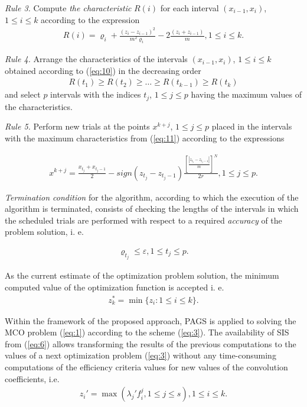 \documentclass[runningheads]{llncs}
\begin{document}
\textit{Rule 3.} Compute \textit{the characteristic} $R(i)$ for each interval $(x_{i-1},x_i)$, $1 \leq i \leq k$ according to the expression 
\begin{eqnarray} \label{eq:10}
R(i) = \varrho_i + \frac{(z_i - z_{i-1})^2}{m^2 \varrho_i} - 2 \frac{(z_i + z_{i-1})}{m}, 1 \leq i \leq k.
\end{eqnarray}

\textit{Rule 4.} Arrange the characteristics of the intervals $(x_{i-1},x_i)$, $1 \leq i \leq k$ obtained according to (\ref{eq:10}) in the decreasing order 
\begin{eqnarray} \label{eq:11}
R(t_1) \geq R(t_2)\geq \dots \geq R(t_{k-1}) \geq R(t_k) 
\end{eqnarray}
and select $p$ intervals with the indices $t_j$, $1 \leq j \leq p$ having the maximum values of the characteristics.

\textit{Rule 5.} Perform new trials at the points $x^{k+j}$, $1 \leq j \leq p$ placed in the intervals with the maximum characteristics from (\ref{eq:11}) according to the expressions 

\begin{eqnarray} \label{eq:12}
	x^{k+j} = \frac{x_{t_j} + x_{t_j-1}}{2}
	- sign(z_{t_j} - z_{t_j-1}) \frac{[\frac{|z_{t_j} - z_{t_j-1}|}{m}]^N}{2r} , 1\leq j \leq p.
\end{eqnarray}

\textit{Termination condition} for the algorithm, according to which the execution of the algorithm is terminated, consists of checking the lengths of the intervals in which the scheduled trials are performed with respect to a required \textit{accuracy} of the problem solution, i. e.

\begin{eqnarray} \label{eq:13}
\varrho_{t_j} \leq \varepsilon, 1 \leq t_j \leq p.
\end{eqnarray}

As the current estimate of the optimization problem solution, the minimum computed value of the optimization function is accepted i. e.
\begin{eqnarray} \label{eq:14}
z_k^*=\min{\{z_i:1\leq i \leq k\}}.
\end{eqnarray}

Within the framework of the proposed approach, PAGS is applied to solving the MCO problem (\ref{eq:1}) according to the scheme (\ref{eq:3}). The availability of SIS from (\ref{eq:6}) allows transforming the results of the previous computations to the values of a next optimization problem (\ref{eq:3}) without any time-consuming computations of the efficiency criteria values for new values of the convolution coefficients, i.e.
\begin{eqnarray} \label{eq:15}
z_i'=\max{(\lambda_j' f_i^j,1\leq j \leq s)},1 \leq i \leq k.
\end{eqnarray}
\end{document}
